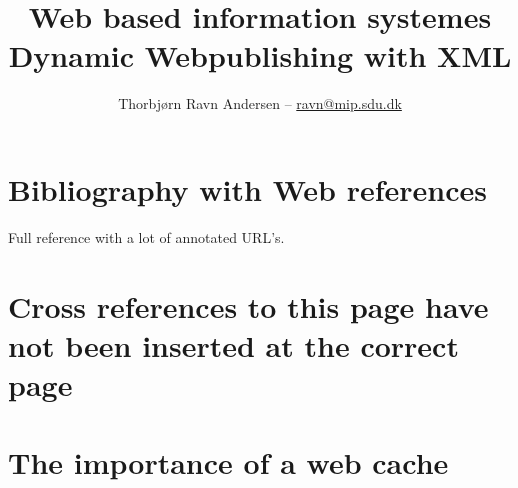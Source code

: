 \documentclass[11pt,a4paper]{book}
\author{Thorbj{\o}rn Ravn Andersen -- \href{mailto:ravn\@mip.sdu.dk}{ravn@mip.sdu.dk}}
\title{{\Huge \textbf{Web based information systemes}}\\
  Dynamic Webpublishing with XML}
\begin{document}


\tableofcontents
{}
\appendix


\section{Bibliography with Web references}
Full reference with a lot of annotated URL's.






\section{Cross references to this page have not been inserted at the
  correct page}

\label{sec:CGI-modperl}
\label{sec:CGI-php3}
\label{sec:CGI-servlets}
\label{sec:html-meta-tags}
\label{cha:on-demand-rendering}
\label{sec:emacs-with-psgml}
\label{sec:java-servlets}
\label{tab:mysql-examiners}
\label{fig:faqomatic-11}

\section{The importance of a web cache}
\label{sec:the-importance-of-a-web-cache}

\end{document}
